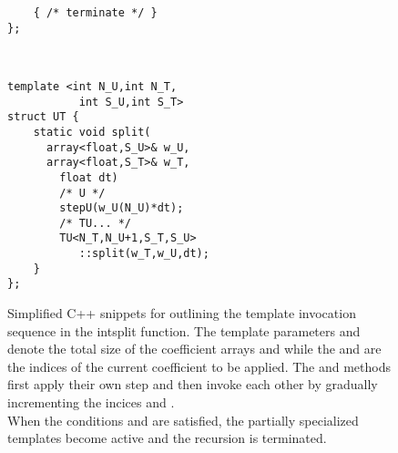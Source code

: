 \begin{figure}
\begin{minipage}[c]{\textwidth}
\begin{minipage}[r][10cm][t]{.4\textwidth}
\begin{minipage}[t]{\textwidth}
\begin{lstlisting}
	{ /* terminate */ }
};
\end{lstlisting}
			\end{minipage} \\
			\vspace{5mm}
			\begin{minipage}[t]{\textwidth}
\begin{lstlisting}
template <int N_U,int N_T,
           int S_U,int S_T>
struct UT {
	static void split(
	  array<float,S_U>& w_U,
	  array<float,S_T>& w_T,
		float dt)
		/* U */
		stepU(w_U(N_U)*dt);
		/* TU... */
		TU<N_T,N_U+1,S_T,S_U>
		   ::split(w_T,w_U,dt);
	}
};
\end{lstlisting}
			\end{minipage}
	\end{minipage}


	\end{minipage}
	\label{fig:intsplit}
	\caption{Simplified C++ snippets for outlining the template invocation sequence in the intsplit function. The template parameters  and  denote the total size of the coefficient arrays  and  while the  and  are the indices of the current coefficient to be applied. The  and  methods first apply their own step and then invoke each other by gradually incrementing the incices  and . \\
	When the conditions  and  are satisfied, the partially specialized templates become active and the recursion is terminated.}
\end{figure}
